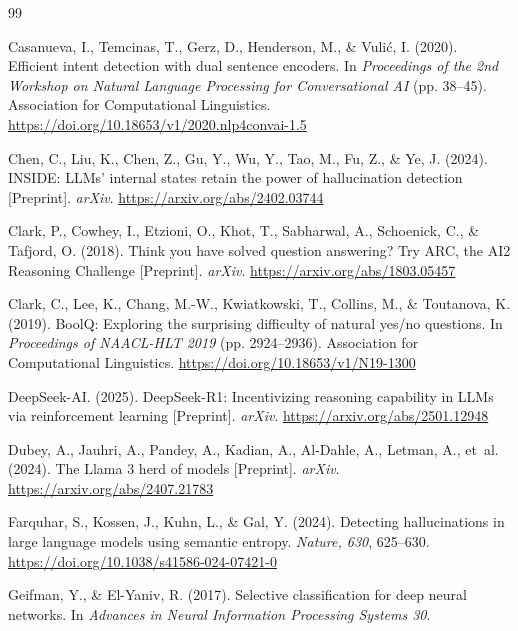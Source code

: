 \documentclass[preprint,12pt,authoryear]{elsarticle}
\begin{document}
\begin{thebibliography}{99}

Casanueva, I., Temcinas, T., Gerz, D., Henderson, M., \& Vuli\'c, I. (2020). Efficient intent detection with dual sentence encoders. In \emph{Proceedings of the 2nd Workshop on Natural Language Processing for Conversational AI} (pp. 38--45). Association for Computational Linguistics. \url{https://doi.org/10.18653/v1/2020.nlp4convai-1.5}

Chen, C., Liu, K., Chen, Z., Gu, Y., Wu, Y., Tao, M., Fu, Z., \& Ye, J. (2024). INSIDE: LLMs' internal states retain the power of hallucination detection [Preprint]. \emph{arXiv}. \url{https://arxiv.org/abs/2402.03744}

Clark, P., Cowhey, I., Etzioni, O., Khot, T., Sabharwal, A., Schoenick, C., \& Tafjord, O. (2018). Think you have solved question answering? Try ARC, the AI2 Reasoning Challenge [Preprint]. \emph{arXiv}. \url{https://arxiv.org/abs/1803.05457}

Clark, C., Lee, K., Chang, M.-W., Kwiatkowski, T., Collins, M., \& Toutanova, K. (2019). BoolQ: Exploring the surprising difficulty of natural yes/no questions. In \emph{Proceedings of NAACL-HLT 2019} (pp. 2924--2936). Association for Computational Linguistics. \url{https://doi.org/10.18653/v1/N19-1300}

DeepSeek-AI. (2025). DeepSeek-R1: Incentivizing reasoning capability in LLMs via reinforcement learning [Preprint]. \emph{arXiv}. \url{https://arxiv.org/abs/2501.12948}

Dubey, A., Jauhri, A., Pandey, A., Kadian, A., Al-Dahle, A., Letman, A., et~al. (2024). The Llama 3 herd of models [Preprint]. \emph{arXiv}. \url{https://arxiv.org/abs/2407.21783}

Farquhar, S., Kossen, J., Kuhn, L., \& Gal, Y. (2024). Detecting hallucinations in large language models using semantic entropy. \emph{Nature, 630}, 625--630. \url{https://doi.org/10.1038/s41586-024-07421-0}

Geifman, Y., \& El-Yaniv, R. (2017). Selective classification for deep neural networks. In \emph{Advances in Neural Information Processing Systems 30}.


\end{thebibliography}
\end{document}
